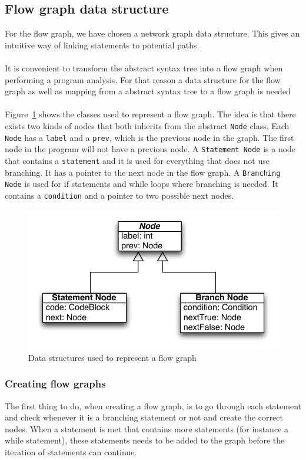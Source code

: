 \subsection{Flow graph data structure}
For the flow graph, we have chosen a network graph data structure. This gives an intuitive way of linking statements to potential paths.
\\
\\
It is convenient to transform the abstract syntax tree into a flow graph when performing a program analysis. For that reason a data structure for the flow graph as well as mapping from a abstract syntax tree to a flow graph is needed 
\\
\\
Figure~\ref{fig:flowgraph} shows the classes used to represent a flow graph. The idea is that there exists two kinds of nodes that both inherits from the abstract \texttt{Node} class. Each \texttt{Node} has a \texttt{label} and a \texttt{prev}, which is the previous node in the graph. The first node in the program will not have a previous node. A \texttt{Statement Node} is a node that contains a \texttt{statement} and it is used for everything that does not use branching. It has a pointer to the next node in the flow graph. A \texttt{Branching Node} is used for if statements and while loops where branching is needed. It contains a \texttt{condition} and a pointer to two possible next nodes.

\begin{figure}[h]
	\centering
	\includegraphics[scale=1.0]{../img/flow_graph}
	\caption{Data structures used to represent a flow graph}
	\label{fig:flowgraph}
\end{figure}

\subsubsection{Creating flow graphs}
The first thing to do, when creating a flow graph, is to go through each statement and check whenever it is a branching statement or not and create the correct nodes. When a statement is met that contains more statements (for instance a while statement), these statements needs to be added to the graph before the iteration of statements can continue.

